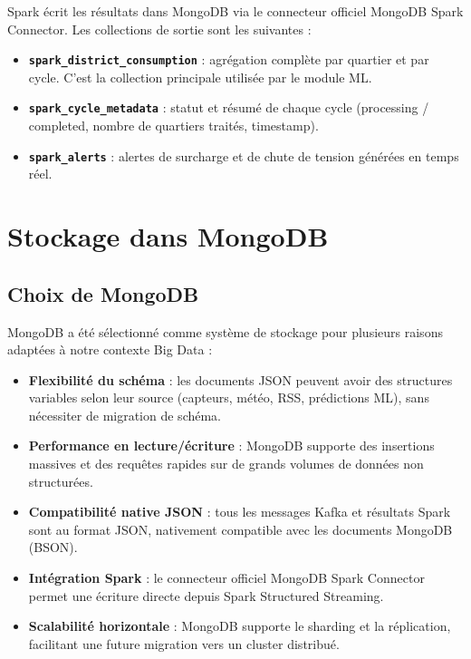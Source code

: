 \documentclass[1pt,a4paper]{report}
\begin{document}
Spark écrit les résultats dans MongoDB via le connecteur officiel MongoDB Spark Connector.
Les collections de sortie sont les suivantes :

\begin{itemize}
    \item \textbf{\texttt{spark\_district\_consumption}} : agrégation complète par
    quartier et par cycle. C'est la collection principale utilisée par le module ML.
    \item \textbf{\texttt{spark\_cycle\_metadata}} : statut et résumé de chaque cycle
    (processing / completed, nombre de quartiers traités, timestamp).
    \item \textbf{\texttt{spark\_alerts}} : alertes de surcharge et de chute de tension
    générées en temps réel.
\end{itemize}


\chapter{Stockage dans MongoDB}

\section{Choix de MongoDB}

MongoDB a été sélectionné comme système de stockage pour plusieurs raisons
adaptées à notre contexte Big Data :

\begin{itemize}
    \item \textbf{Flexibilité du schéma} : les documents JSON peuvent avoir des structures
    variables selon leur source (capteurs, météo, RSS, prédictions ML), sans nécessiter
    de migration de schéma.
    \item \textbf{Performance en lecture/écriture} : MongoDB supporte des insertions massives
    et des requêtes rapides sur de grands volumes de données non structurées.
    \item \textbf{Compatibilité native JSON} : tous les messages Kafka et résultats Spark
    sont au format JSON, nativement compatible avec les documents MongoDB (BSON).
    \item \textbf{Intégration Spark} : le connecteur officiel MongoDB Spark Connector permet
    une écriture directe depuis Spark Structured Streaming.
    \item \textbf{Scalabilité horizontale} : MongoDB supporte le sharding et la réplication,
    facilitant une future migration vers un cluster distribué.
\end{itemize}
\end{document}
